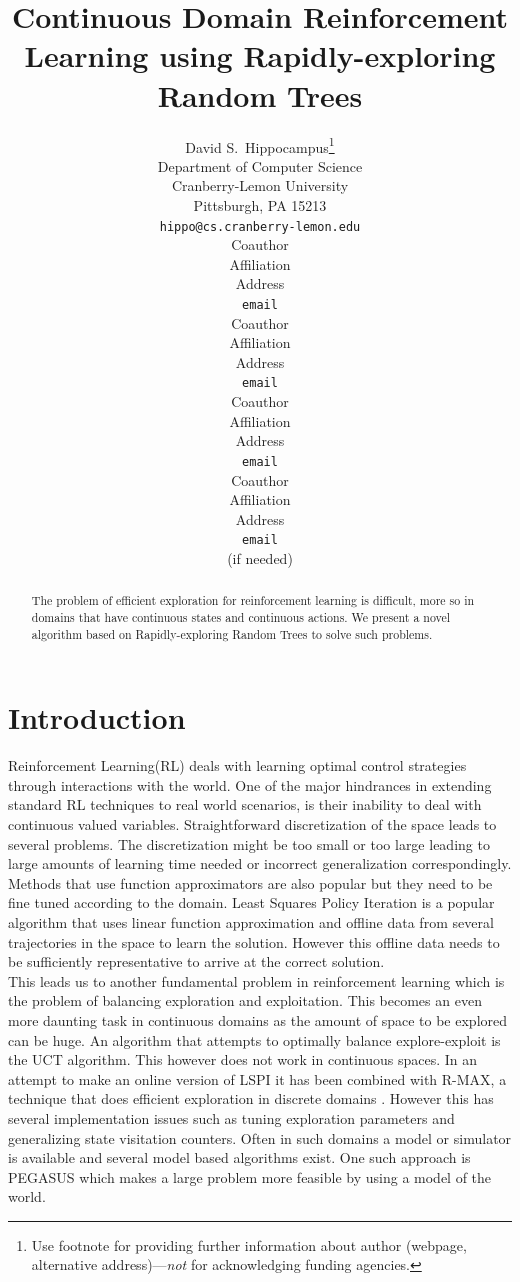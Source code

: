 \documentclass{article} %
\title{Continuous Domain Reinforcement Learning using Rapidly-exploring Random Trees}
\author{
David S.~Hippocampus\thanks{ Use footnote for providing further information
about author (webpage, alternative address)---\emph{not} for acknowledging
funding agencies.} \\
Department of Computer Science\\
Cranberry-Lemon University\\
Pittsburgh, PA 15213 \\
\texttt{hippo@cs.cranberry-lemon.edu} \\
\And
Coauthor \\
Affiliation \\
Address \\
\texttt{email} \\
\AND
Coauthor \\
Affiliation \\
Address \\
\texttt{email} \\
\And
Coauthor \\
Affiliation \\
Address \\
\texttt{email} \\
\And
Coauthor \\
Affiliation \\
Address \\
\texttt{email} \\
(if needed)\\
}
\begin{document}
\maketitle

\begin{abstract}
The problem of efficient exploration for reinforcement learning is difficult, more so in domains that have continuous states and continuous actions. We present a novel algorithm based on Rapidly-exploring Random Trees to solve such problems.
\end{abstract}

\section{Introduction}
Reinforcement Learning(RL) deals with learning optimal control strategies through interactions with the world. One of the major hindrances in extending standard RL techniques to real world scenarios, is their inability to deal with continuous valued variables. Straightforward discretization of the space leads to several problems. The discretization might be too small or too large leading to large amounts of learning time needed or incorrect generalization correspondingly. Methods that use function approximators are also popular but they need to be fine tuned according to the domain. Least Squares Policy Iteration \cite{lspi} is a popular algorithm that uses linear function approximation and offline data from several trajectories in the space to learn the solution. However this offline data needs to be sufficiently representative to arrive at the correct solution.\\
 This leads us to another fundamental problem in reinforcement learning which is the problem of balancing exploration and exploitation. This becomes an even more daunting task in continuous domains as the amount of space to be explored can be huge. An algorithm that attempts to optimally balance explore-exploit is the UCT algorithm\cite{uct}. This however does not work in continuous spaces. In an attempt to make an online version of LSPI it has been combined with R-MAX, a technique that does efficient exploration in discrete domains\cite{rmaxlspi} . However this has several implementation issues such as tuning exploration parameters and generalizing state visitation counters. Often in such domains a model or simulator is available and several model based algorithms exist. One such approach is PEGASUS \cite{pegasus} which makes a large problem more feasible by using a model of the world.\\
\end{document}
